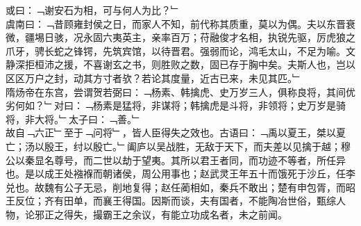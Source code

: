 或曰：﹁谢安石为相，可与何人为比？﹂\\
虞南曰：﹁昔顾雍封侯之日，而家人不知，前代称其质重，莫以为偶。夫以东晋衰微，疆埸日骇，况永固六夷英主，亲率百万；苻融俊才名相，执锐先驱，厉虎狼之爪牙，骋长蛇之锋锷，先筑宾馆，以待晋君。强弱而论，鸿毛太山，不足为喻。文静深拒桓沛之援，不喜谢玄之书，则胜败之数，固已存于胸中矣。夫斯人也，岂以区区万户之封，动其方寸者欤？若论其度量，近古已来，未见其匹。﹂\\
隋炀帝在东宫，尝谓贺若弼曰：﹁杨素、韩擒虎、史万岁三人，俱称良将，其间优劣何如？﹂对曰：﹁杨素是猛将，非谋将；韩擒虎是斗将，非领将；史万岁是骑将，非大将。﹂太子曰：﹁善。﹂\\
故自﹁六正﹂至于﹁问将﹂，皆人臣得失之效也。古语曰：﹁禹以夏王，桀以夏亡；汤以殷王，纣以殷亡。﹂阖庐以吴战胜，无敌于天下，而夫差以见擒于越；穆公以秦显名尊号，而二世以劫于望夷。其所以君王者同，而功迹不等者，所任异也。是以成王处襁褓而朝诸侯，周公用事也；赵武灵王年五十而饿死于沙丘，任李兑也。故魏有公子无忌，削地复得；赵任蔺相如，秦兵不敢出；楚有申包胥，而昭王反位；齐有田单，而襄王得国。因斯而谈，夫有国者，不能陶冶世俗，甄综人物，论邪正之得失，撮霸王之余议，有能立功成名者，未之前闻。\\%
%
